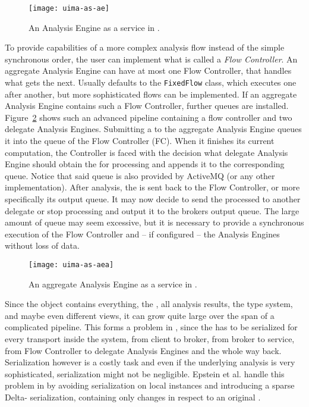 \begin{figure}[hbt]
	\centering
	\texttt{[image: uima-as-ae]}
	\caption[An Analysis Engine as a service in UIMA-AS.]{An Analysis Engine as a service in \uimaas{} \cite{uimaas:documentation}.}
	\label{fig:uimaas-ae}
\end{figure}

To provide capabilities of a more complex analysis flow instead of the simple synchronous order, the user can implement what is called a \emph{Flow Controller}. An aggregate Analysis Engine can have at most one Flow Controller, that handles what \anen{} gets the \cas{} next. Usually \uima{} defaults to the \lstinline|FixedFlow| class, which executes \anens{} one after another, but more sophisticated flows can be implemented. If an aggregate Analysis Engine contains such a Flow Controller, further queues are installed. Figure~\ref{fig:uimaas-aea} shows such an advanced pipeline containing a flow controller and two delegate Analysis Engines. Submitting a \cas{} to the aggregate Analysis Engine queues it into the queue of the Flow Controller (FC). When it finishes its current computation, the Controller is faced with the decision what delegate Analysis Engine should obtain the \cas{} for processing and appends it to the corresponding queue. Notice that said queue is also provided by ActiveMQ (or any other implementation). After analysis, the \cas{} is sent back to the Flow Controller, or more specifically its output queue. It may now decide to send the processed \cas{} to another delegate \anen{} or stop processing and output it to the brokers output queue. The large amount of queue may seem excessive, but it is necessary to provide a synchronous execution of the Flow Controller and -- if configured -- the Analysis Engines without loss of data.

\begin{figure}[hbt]
	\centering
	\texttt{[image: uima-as-aea]}
	\caption[An aggregate Analysis Engine as a service in UIMA-AS.]{An aggregate Analysis Engine as a service in \uimaas{} \cite{uimaas:documentation}.}
	\label{fig:uimaas-aea}
\end{figure}

Since the \cas{} object contains everything, the \sofa{}, all analysis results, the type system, and maybe even different views, it can grow quite large over the span of a complicated pipeline. This forms a problem in \uimaas{}, since the \cas{} has to be serialized for every transport inside the system, from client to broker, from broker to service, from Flow Controller to delegate Analysis Engines and the whole way back. Serialization however is a costly task and even if the underlying \nlp{} analysis is very sophisticated, serialization might not be negligible. Epstein et al. handle this problem in \cite{epstein2012making} by avoiding serialization on local instances and introducing a sparse Delta-\cas{} serialization, containing only changes in respect to an original \cas{}.

